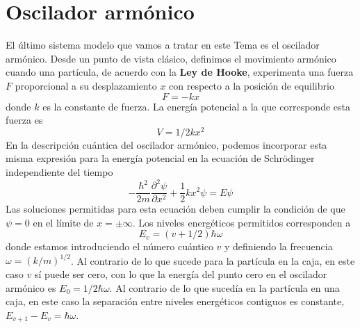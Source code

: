 \section{Oscilador armónico}
El último sistema modelo que vamos a tratar en este Tema es
el oscilador armónico. Desde un punto de vista clásico, 
definimos el movimiento armónico cuando una partícula,
de acuerdo con la \textbf{Ley de Hooke}, experimenta una fuerza $F$ proporcional a su desplazamiento $x$ con 
respecto a la posición de equilibrio
\begin{equation}
    F=-kx
\end{equation}
donde $k$ es la constante de fuerza. La energía potencial 
a la que corresponde esta fuerza es
\begin{equation}
    V= 1/2kx^2
\end{equation}
En la descripción cuántica del oscilador armónico, podemos 
incorporar esta misma expresión para la energía potencial
en la ecuación de Schrödinger independiente del tiempo
\begin{equation}
    -\frac{\hbar^2}{2m}\frac{\partial^2\psi}{\partial x^2}
    + \frac{1}{2}kx^2\psi=E\psi \label{eq:schrodinger_ho}
\end{equation}
Las soluciones permitidas para esta ecuación deben cumplir
la condición de que $\psi=0$ en el límite de $x=\pm\infty$.
Los niveles energéticos permitidos corresponden a 
\begin{equation}
    E_v=(v+1/2)\hbar\omega
\end{equation}
donde estamos introduciendo el número cuántico $v$ y 
definiendo la frecuencia $\omega=(k/m)^{1/2}$. Al contrario
de lo que sucede para la partícula en la caja, en este 
caso $v$ sí puede ser cero, con lo que la energía del punto
cero en el oscilador armónico es $E_0=1/2\hbar\omega$. Al
contrario de lo que sucedía en la partícula en una caja, 
en este caso la separación entre niveles energéticos 
contiguos es constante, $E_{v+1}-E_{v}=\hbar\omega$.

